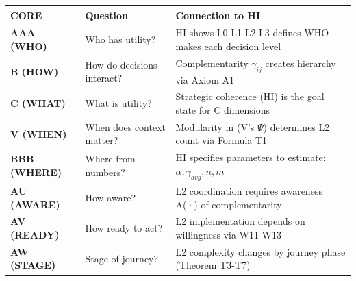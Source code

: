 \documentclass[11pt, a4paper]{article}
\begin{document}

\begin{tcolorbox}[colback=yellow!5!white, colframe=yellow!75!black, title=10C Integration Table: How HI CORE-HIERARCHY Connects to All COREs]

\begin{center}
\begin{tabular}{|l|p{3cm}|p{4cm}|}
\hline
\textbf{CORE} & \textbf{Question} & \textbf{Connection to HI} \\
\hline
\textbf{AAA (WHO)} & Who has utility? & HI shows L0-L1-L2-L3 defines WHO makes each decision level \\
\hline
\textbf{B (HOW)} & How do decisions interact? & Complementarity $\gamma_{ij}$ creates hierarchy via Axiom A1 \\
\hline
\textbf{C (WHAT)} & What is utility? & Strategic coherence (HI) is the goal state for C dimensions \\
\hline
\textbf{V (WHEN)} & When does context matter? & Modularity m (V's $\Psi$) determines L2 count via Formula T1 \\
\hline
\textbf{BBB (WHERE)} & Where from numbers? & HI specifies parameters to estimate: $\alpha, \gamma_{avg}, n, m$ \\
\hline
\textbf{AU (AWARE)} & How aware? & L2 coordination requires awareness A(·) of complementarity \\
\hline
\textbf{AV (READY)} & How ready to act? & L2 implementation depends on willingness via W11-W13 \\
\hline
\textbf{AW (STAGE)} & Stage of journey? & L2 complexity changes by journey phase (Theorem T3-T7) \\
\hline
\end{tabular}
\end{center}

\end{tcolorbox}

\end{document}
